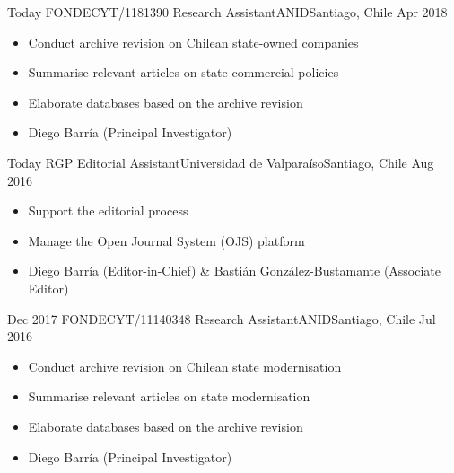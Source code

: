 






\begin{experiences}
  \emptySeparator 
  \experience 
    {Today} {FONDECYT/1181390 Research Assistant}{ANID}{Santiago, Chile} {Apr 2018}
    {\begin{itemize}
    \item Conduct archive revision on Chilean state-owned companies
    \item Summarise relevant articles on state commercial policies
    \item Elaborate databases based on the archive revision
    \item Diego Barría {\small (Principal Investigator)}
    \end{itemize}}
    {}
\end{experiences}
\vspace{-2mm}

\begin{experiences}
  \experience
    {Today} {RGP Editorial Assistant}{Universidad de Valparaíso}{Santiago, Chile} {Aug 2016}
    {\begin{itemize}
    \item Support the editorial process
    \item Manage the Open Journal System (OJS) platform 
    \item Diego Barría {\small (Editor-in-Chief)} \& Bastián González-Bustamante {\small (Associate Editor)}
    \end{itemize}}
    {}
\end{experiences}
\vspace{-2mm}

\begin{experiences}
  \emptySeparator 
  \experience 
    {Dec 2017} {FONDECYT/11140348 Research Assistant}{ANID}{Santiago, Chile} {Jul 2016}
    {\begin{itemize}
    \item Conduct archive revision on Chilean state modernisation
    \item Summarise relevant articles on state modernisation
    \item Elaborate databases based on the archive revision
    \item Diego Barría {\small (Principal Investigator)}
    \end{itemize}}
    {}
\end{experiences}
\vspace{-2mm}

